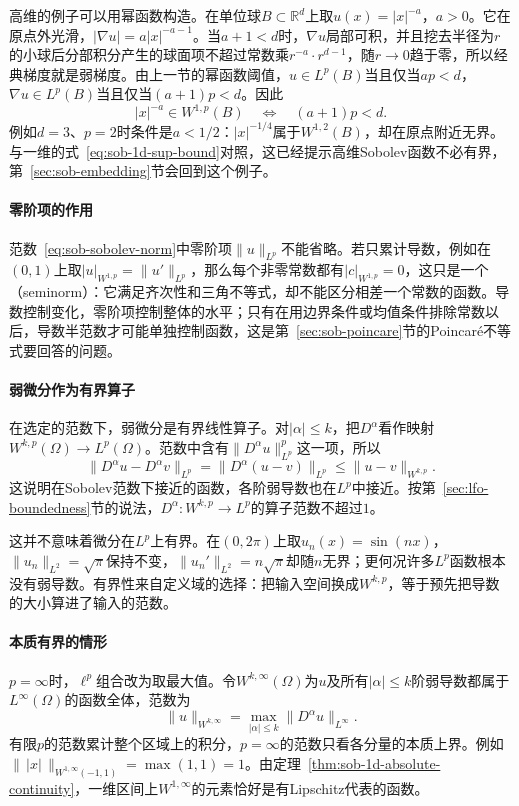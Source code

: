 高维的例子可以用幂函数构造。在单位球$B\subset\mathbb R^d$上取$u(x)=|x|^{-a}$，$a>0$。它在原点外光滑，$|\nabla u|=a|x|^{-a-1}$。当$a+1<d$时，$\nabla u$局部可积，并且挖去半径为$r$的小球后分部积分产生的球面项不超过常数乘$r^{-a}\cdot r^{d-1}$，随$r\to0$趋于零，所以经典梯度就是弱梯度。由上一节的幂函数阈值，$u\in L^p(B)$当且仅当$ap<d$，$\nabla u\in L^p(B)$当且仅当$(a+1)p<d$。因此
\begin{equation}
 |x|^{-a}\in W^{1,p}(B)\quad\Longleftrightarrow\quad(a+1)p<d .
 \label{eq:sob-power-membership}
\end{equation}
例如$d=3$、$p=2$时条件是$a<1/2$：$|x|^{-1/4}$属于$W^{1,2}(B)$，却在原点附近无界。与一维的式~\eqref{eq:sob-1d-sup-bound}对照，这已经提示高维Sobolev函数不必有界，第~\ref{sec:sob-embedding}节会回到这个例子。

\paragraph{零阶项的作用}
范数~\eqref{eq:sob-sobolev-norm}中零阶项$\|u\|_{L^p}$不能省略。若只累计导数，例如在$(0,1)$上取$|u|_{W^{1,p}}=\|u'\|_{L^p}$，那么每个非零常数都有$|c|_{W^{1,p}}=0$，这只是一个（seminorm）：它满足齐次性和三角不等式，却不能区分相差一个常数的函数。导数控制变化，零阶项控制整体的水平；只有在用边界条件或均值条件排除常数以后，导数半范数才可能单独控制函数，这是第~\ref{sec:sob-poincare}节的Poincaré不等式要回答的问题。

\paragraph{弱微分作为有界算子}
在选定的范数下，弱微分是有界线性算子。对$|\alpha|\le k$，把$D^\alpha$看作映射$W^{k,p}(\Omega)\to L^p(\Omega)$。范数中含有$\|D^\alpha u\|_{L^p}^p$这一项，所以
\[
 \|D^\alpha u-D^\alpha v\|_{L^p}=\|D^\alpha(u-v)\|_{L^p}\le\|u-v\|_{W^{k,p}} .
\]
这说明在Sobolev范数下接近的函数，各阶弱导数也在$L^p$中接近。按第~\ref{sec:lfo-boundedness}节的说法，$D^\alpha:W^{k,p}\to L^p$的算子范数不超过$1$。

这并不意味着微分在$L^p$上有界。在$(0,2\pi)$上取$u_n(x)=\sin(nx)$，$\|u_n\|_{L^2}=\sqrt\pi$保持不变，$\|u_n'\|_{L^2}=n\sqrt\pi$却随$n$无界；更何况许多$L^p$函数根本没有弱导数。有界性来自定义域的选择：把输入空间换成$W^{k,p}$，等于预先把导数的大小算进了输入的范数。

\paragraph{本质有界的情形}
$p=\infty$时，$\ell^p$组合改为取最大值。令$W^{k,\infty}(\Omega)$为$u$及所有$|\alpha|\le k$阶弱导数都属于$L^\infty(\Omega)$的函数全体，范数为
\[
 \|u\|_{W^{k,\infty}}=\max_{|\alpha|\le k}\|D^\alpha u\|_{L^\infty} .
\]
有限$p$的范数累计整个区域上的积分，$p=\infty$的范数只看各分量的本质上界。例如$\|\,|x|\,\|_{W^{1,\infty}(-1,1)}=\max(1,1)=1$。由定理~\ref{thm:sob-1d-absolute-continuity}，一维区间上$W^{1,\infty}$的元素恰好是有Lipschitz代表的函数。


